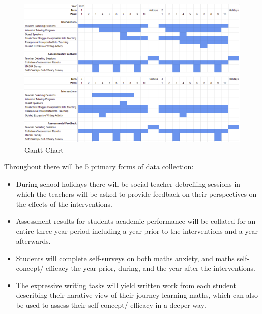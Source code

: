 \documentclass[14pt]{memoir}
\begin{document}
 \begin{figure}
 \includegraphics[scale=0.7]{Gantt_Chart.PNG}
\caption{Gantt Chart \label{fig:gantt}}
\end{figure}



 Throughout there will be 5 primary forms of data collection:
 \begin{itemize}
 	\item  During school holidays there will be social teacher debrefiing sessions in which the teachers will be asked to provide feedback on their perspectives on the effects of the interventions.
 	\item Assessment results for students academic performance will be collated for an entire three year period including a year prior to the interventions and a year afterwards.
 	\item Students will complete self-surveys on both maths anxiety, and maths self-concept/ efficacy the year prior, during, and the year after the interventions.
 	\item The expressive writing tasks will yield written work from each student describing their narative view of their journey learning maths, which can also be used to assess their self-concept/ efficacy in a deeper way.
 \end{itemize}
\end{document}
